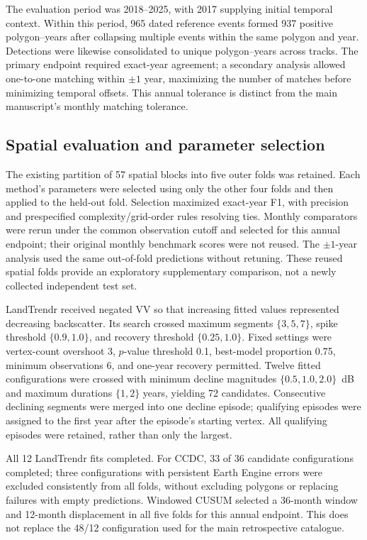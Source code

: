 \documentclass[11pt,a4paper]{article}
\begin{document}
The evaluation period was 2018--2025, with 2017 supplying initial temporal context. Within this period, 965 dated reference events formed 937 positive polygon--years after collapsing multiple events within the same polygon and year. Detections were likewise consolidated to unique polygon--years across tracks. The primary endpoint required exact-year agreement; a secondary analysis allowed one-to-one matching within $\pm1$ year, maximizing the number of matches before minimizing temporal offsets. This annual tolerance is distinct from the main manuscript's monthly matching tolerance.

\subsection{Spatial evaluation and parameter selection}
The existing partition of 57 spatial blocks into five outer folds was retained. Each method's parameters were selected using only the other four folds and then applied to the held-out fold. Selection maximized exact-year F1, with precision and prespecified complexity/grid-order rules resolving ties. Monthly comparators were rerun under the common observation cutoff and selected for this annual endpoint; their original monthly benchmark scores were not reused. The $\pm1$-year analysis used the same out-of-fold predictions without retuning. These reused spatial folds provide an exploratory supplementary comparison, not a newly collected independent test set.

LandTrendr received negated VV so that increasing fitted values represented decreasing backscatter. Its search crossed maximum segments $\{3,5,7\}$, spike threshold $\{0.9,1.0\}$, and recovery threshold $\{0.25,1.0\}$. Fixed settings were vertex-count overshoot 3, $p$-value threshold 0.1, best-model proportion 0.75, minimum observations 6, and one-year recovery permitted. Twelve fitted configurations were crossed with minimum decline magnitudes $\{0.5,1.0,2.0\}$~dB and maximum durations $\{1,2\}$ years, yielding 72 candidates. Consecutive declining segments were merged into one decline episode; qualifying episodes were assigned to the first year after the episode's starting vertex. All qualifying episodes were retained, rather than only the largest.

All 12 LandTrendr fits completed. For CCDC, 33 of 36 candidate configurations completed; three configurations with persistent Earth Engine errors were excluded consistently from all folds, without excluding polygons or replacing failures with empty predictions. Windowed CUSUM selected a 36-month window and 12-month displacement in all five folds for this annual endpoint. This does not replace the 48/12 configuration used for the main retrospective catalogue.
\end{document}
